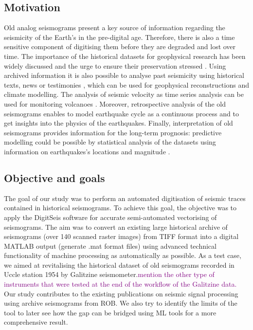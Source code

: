 \documentclass[informatics,article,submit,moreauthors,pdftex]{Definitions/mdpi}
\newcommand{\todo}[1]{\textcolor{purple}{#1}}
\begin{document}
\subsection{Motivation}
Old analog seismograms present a key source of information regarding the seismicity of the Earth's in the pre-digital age. Therefore, there is also a time sensitive component of digitising them before they are degraded and lost over time. The importance of the historical datasets for geophysical research has been widely discussed \cite{Vogtetal1985, TevesCosta1999,Bono2007,Okal} and the urge to ensure their preservation stressed \cite{Okal}. Using archived information it is also possible to analyse past seismicity using historical texts, news or testimonies \cite{Alexandre1990a,Alexandre1985,Alexandre1990b}, which can be used for geophysical reconstructions and climate modelling. The analysis of seismic velocity as time series analysis can be used for monitoring volcanoes \cite{DePlaen2016,Basowetal,DePlaen2019}. Moreover, retrospective analysis of the old seismograms enables to model earthquake cycle as a continuous process and to get insights into the physics of the earthquakes. Finally, interpretation of old seismograms provides information for the long-term prognosis: predictive modelling could be possible by statistical analysis of the datasets using information on earthquakes's locations and magnitude \cite{Kanamori1988}.

\subsection{Objective and goals}
The goal of our study was to perform an automated digitisation of seismic traces contained in historical seismograms. To achieve this goal, the objective was to apply the DigitSeis software for accurate semi-automated vectorising of seismograms. The aim was to convert an existing large historical archive of seismograms (over 140 scanned raster images) from TIFF format into a digital MATLAB output (generate .mat format files) using advanced technical functionality of machine processing as automatically as possible. As a test case, we aimed at revitalising the historical dataset of old seismograms recorded in Uccle station 1954 by Galitzine seismometer.\todo{mention the other type of instruments that were tested at the end of the workflow of the Galitzine data.} Our study contributes to the existing publications on seismic signal processing using archive seismograms from \ac{ROB}. We also try to identify the limits of the tool to later see how the gap can be bridged using ML tools for a more comprehensive result.
\end{document}
